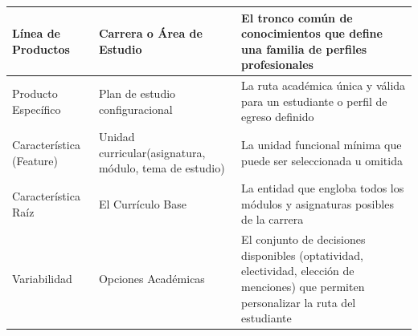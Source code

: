 {{{\begin{longtable}{|p{5cm}|p{5cm}|p{5cm}|}
                Línea de Productos & Carrera o Área de Estudio & El tronco común de conocimientos que define una familia de perfiles profesionales \\ 
                \hline
                \rowcolor[HTML]{EDEBF1}
                Producto Específico & Plan de estudio configuracional & La ruta académica única y válida para un estudiante o perfil de egreso definido \\ 
                \hline
                Característica (Feature) & Unidad curricular(asignatura, módulo, tema de estudio) & La unidad funcional mínima que puede ser seleccionada u omitida \\
                \hline
                \rowcolor[HTML]{EDEBF1}
                Característica Raíz & El Currículo Base & La entidad que engloba todos los módulos y asignaturas posibles de la carrera \\
                \hline
                Variabilidad & Opciones Académicas & El conjunto de decisiones disponibles (optatividad, electividad, elección de menciones) que permiten personalizar la ruta del estudiante \\
                \hline
            \end{longtable}

}}}
